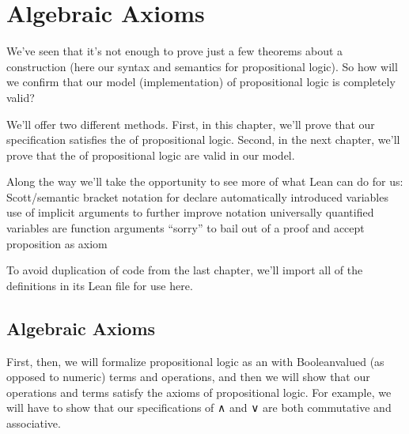 \documentclass[letterpaper,10pt,english]{sphinxmanual}
\begin{document}
\begin{sphinxVerbatim}[commandchars=\\\{\}]
 
 
\end{sphinxVerbatim}


\section{Algebraic Axioms}
\label{\detokenize{A_01_Propositional_Logic:algebraic-axioms}}
\sphinxAtStartPar
We’ve seen that it’s not enough to prove just a few
theorems about a construction (here our syntax and
semantics for propositional logic). So how will we
confirm  that our model (implementation)
of propositional logic is completely valid?

\sphinxAtStartPar
We’ll offer two different methods. First, in this
chapter, we’ll prove that our specification satisfies
the  of propositional logic. Second,
in the next chapter, we’ll prove that the  of propositional logic are valid in our model.

\sphinxAtStartPar
Along the way we’ll take the opportunity to see more
of what Lean can do for us:
\sphinxhyphen{} Scott/semantic bracket notation for 
\sphinxhyphen{} declare automatically introduced variables
\sphinxhyphen{} use of implicit arguments to further improve notation
\sphinxhyphen{} universally quantified variables are function arguments
\sphinxhyphen{} “sorry” to bail out of a proof and accept proposition as axiom

\sphinxAtStartPar
To avoid duplication of code from the last chapter,
we’ll import all of the definitions in its Lean file
for use here.


\subsection{Algebraic Axioms}
\label{\detokenize{A_01_Propositional_Logic:id9}}
\sphinxAtStartPar
First, then, we will formalize propositional logic as an
 with Boolean\sphinxhyphen{}valued (as opposed to numeric) terms
and operations, and then we will show that our operations and
terms satisfy the axioms of propositional logic. For example,
we will have to show that our specifications of ∧ and ∨ are
both commutative and associative.
\end{document}
